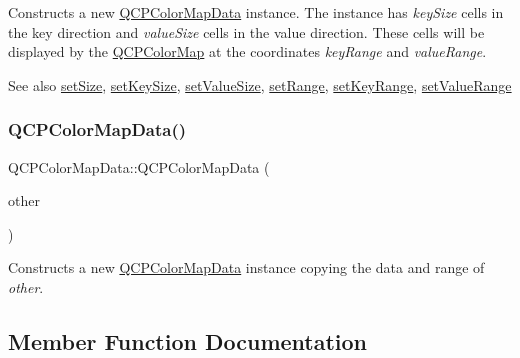 Constructs a new \hyperlink{classQCPColorMapData}{Q\+C\+P\+Color\+Map\+Data} instance. The instance has {\itshape key\+Size} cells in the key direction and {\itshape value\+Size} cells in the value direction. These cells will be displayed by the \hyperlink{classQCPColorMap}{Q\+C\+P\+Color\+Map} at the coordinates {\itshape key\+Range} and {\itshape value\+Range}.

\begin{DoxySeeAlso}{See also}
\hyperlink{classQCPColorMapData_a0d9ff35c299d0478b682bfbcdd9c097e}{set\+Size}, \hyperlink{classQCPColorMapData_ac7ef70e383aface34b44dbde49234b6b}{set\+Key\+Size}, \hyperlink{classQCPColorMapData_a0893c9e3914513048b45e3429ffd16f2}{set\+Value\+Size}, \hyperlink{classQCPColorMapData_aad9c1c7c703c1339489fc730517c83d4}{set\+Range}, \hyperlink{classQCPColorMapData_a0738c485f3c9df9ea1241b7a8bb6a86e}{set\+Key\+Range}, \hyperlink{classQCPColorMapData_ada1b2680ba96a5f4175b6d341cf75d23}{set\+Value\+Range} 
\end{DoxySeeAlso}
\mbox{\label{classQCPColorMapData_a7f2145d86473263494abb9bf1de20436}} 
\subsubsection{\texorpdfstring{Q\+C\+P\+Color\+Map\+Data()}{QCPColorMapData()}\hspace{0.1cm}{\footnotesize\ttfamily [2/2]}}
{\footnotesize\ttfamily Q\+C\+P\+Color\+Map\+Data\+::\+Q\+C\+P\+Color\+Map\+Data (\begin{DoxyParamCaption}\item[{const \hyperlink{classQCPColorMapData}{Q\+C\+P\+Color\+Map\+Data} \&}]{other }\end{DoxyParamCaption})}

Constructs a new \hyperlink{classQCPColorMapData}{Q\+C\+P\+Color\+Map\+Data} instance copying the data and range of {\itshape other}. 

\subsection{Member Function Documentation}
\mbox{\label{classQCPColorMapData_a4f7e6b7a97017400cbbd46f0660e68ea}} 
